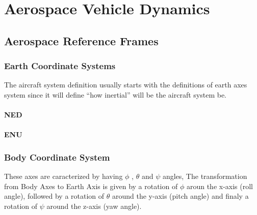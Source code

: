 \chapter{Aerospace Vehicle Dynamics}

\section{Aerospace Reference Frames}
\subsection{Earth Coordinate Systems}
The aircraft system definition usually starts with the definitions of earth axes
system since it will define ``how inertial'' will be the aircraft system be.
\subsubsection{NED}
\subsubsection{ENU}

\subsection{Body Coordinate System}
These axes are caracterized by having $\phi$ , $\theta$ and $\psi$ angles,
The transformation from Body Axes to Earth Axis is given by a rotation of $\phi$ aroun
the x-axis (roll angle), followed by a rotation of $\theta$ around the y-axis (pitch angle)
and finaly a rotation of $\psi$ around the z-axis (yaw angle).

